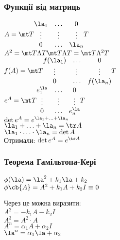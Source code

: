 \subsubsection{Функції від матриць}
$A = \mt T \begin{matrix}
\la_1 &\ldots & 0 \\
\vdots & \vdots & \vdots \\
0 & \ldots & \la_n
\end{matrix} T$ \\
$A^2 = \mt T \Lambda T \mt T \Lambda T = \mt T \Lambda^2 T$\\
$f(A) = \mt T \begin{matrix}
f(\la_1) &\ldots & 0 \\
\vdots & \vdots & \vdots \\
0 & \ldots & f(\la_n)
\end{matrix} T$\\
$e^A = \mt T \begin{matrix}
e^\la_1 &\ldots & 0 \\
\vdots & \vdots & \vdots \\
0 & \ldots & e^\la_n
\end{matrix} T$\\
$\det e^A = e^{\la_1+\ldots+\la_n}$\\
$\la_1+\ldots+\la_n = \tr A$\\
$\la_1\cdot\ldots\cdot\la_n = \det A$\\
Отримали: $\det e^A = e^{\tr A}$\\
\subsubsection{Теорема Гамільтона-Кері}
\begin{exs}
$\phi(\la) = \la^2 + k_1\la + k_2$\\
$\phi\cb{A} = A^2 + k_1 A + k_2 I \equiv 0$
\end{exs}
Через це можна виразити:\\
$A^2 = -k_1 A -k_2I$\\
$A^3 = A^2\cdot A$\\
$A^n = \alpha_1 A +\alpha_2 I$\\
$\la^n = \alpha_1 \la+\alpha_2$\\